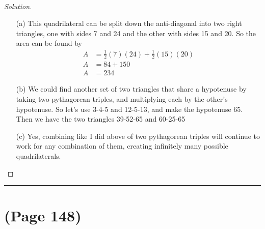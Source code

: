 \documentclass[11pt]{article}
\newenvironment{solution}
  {\renewcommand\qedsymbol{$~$}\begin{proof}[Solution]$ $\par\nobreak\ignorespaces}
  {\end{proof}}
\begin{document}
~\\
\begin{solution}
  \begin{itemize}
    \item [(a)] This quadrilateral can be split down the anti-diagonal into two right triangles, one with sides 7 and 24 and the other with sides 15 and 20. So the area can be found by
          \begin{align*}
            A & = \frac{1}{2}(7)(24) + \frac{1}{2}(15)(20) \\
            A & = 84 + 150                                 \\
            A & = 234
          \end{align*}
    \item [(b)] We could find another set of two triangles that share a hypotenuse by taking two pythagorean triples, and multiplying each by the other's hypotenuse. So let's use 3-4-5 and 12-5-13, and make the hypotenuse 65. Then we have the two triangles 39-52-65 and 60-25-65

          \begin{center}
          \end{center}

    \item [(c)] Yes, combining like I did above of two pythagorean triples will continue to work for any combination of them, creating infinitely many possible quadrilaterals.
  \end{itemize}
\end{solution}



\hrule
\section{(Page 148)}
\end{document}
